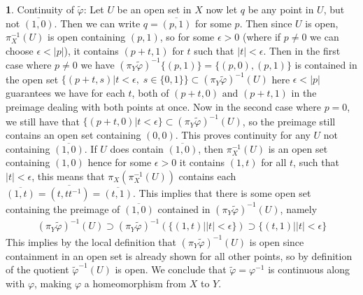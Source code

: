 \documentclass[10.5pt]{article}
\theoremstyle{definition}
\newtheorem{pb}{}
\newcommand{\set}[1]{\{#1\}}
\newcommand{\abs}[1]{\lvert#1\rvert}
\newcommand{\tand}{\text{ and }}
\begin{document}
\begin{pb}
        Continuity of \(\tilde{\varphi}\): Let \(U\) be an open set in \(X\) now let \(q\) be any point in \(U\), but not \(\overline{(1,0)}\). Then we can write \(q = \overline{(p,1)}\) for some \(p\).
        Then since \(U\) is open, \(\pi_X^{-1}(U)\) is open containing \((p,1)\), so for some \(\epsilon > 0\) (where if \(p \neq 0\)
        we can choose \(\epsilon < \abs{p}\)), it contains \((p + t,1)\) for \(t\) such that \(\abs{t} < \epsilon\).
        Then in the first case where \(p \neq 0\) we have
        \((\pi_Y\tilde{\varphi})^{-1}\set{(p,1)} = \set{(p,0), (p,1)}\) is contained in the open set \(\set{(p + t,s) \vert t < \epsilon, \; s \in \set{0,1}} \subset (\pi_Y\tilde{\varphi})^{-1}(U)\) 
        here \(\epsilon < \abs{p}\) guarantees we have for each \(t\), both of \((p+t,0) \tand (p+t,1)\) in the preimage dealing with both points at once. Now in the second case where \(p = 0\), we still have that 
        \(\set{(p + t,0) \vert t < \epsilon} \subset (\pi_Y\tilde{\varphi})^{-1}(U)\), so the preimage still contains an open set containing \((0,0)\). This proves continuity for any \(U\)
        not containing \(\overline{(1,0)}\). If \(U\) does contain \(\overline{(1,0)}\), then \(\pi_X^{-1}(U)\) is an open set containing \((1,0)\) hence for some \(\epsilon > 0\) it contains 
        \((1,t)\) for all \(t\), such that \(\abs{t} < \epsilon\), this means that \(\pi_X(\pi_X^{-1}(U))\) contains each \(\overline{(1,t)} = \overline{(t,tt^{-1})} = \overline{(t,1)}\).
        This implies that there is some open set containing the preimage of \(\overline{(1,0)}\) contained in \((\pi_Y\tilde{\varphi})^{-1}(U)\),
        namely \begin{align*}
            (\pi_Y\tilde{\varphi})^{-1}(U) \supset (\pi_Y\tilde{\varphi})^{-1}(\set{(1,t) \vert \abs{t} < \epsilon}) \supset \set{(t,1) \vert \abs{t} < \epsilon}
        \end{align*}
        This implies by the local definition that \((\pi_Y\tilde{\varphi})^{-1}(U)\) is open since containment in an open set is already shown for all other points, so by definition of the quotient 
        \(\tilde{\varphi}^{-1}(U)\) is open. We conclude that
        \(\tilde{\varphi} = \varphi^{-1}\) is continuous along with \(\varphi\), making \(\varphi\) a homeomorphism from \(X\) to \(Y\).
    \end{pb}
    \newpage
\end{document}
